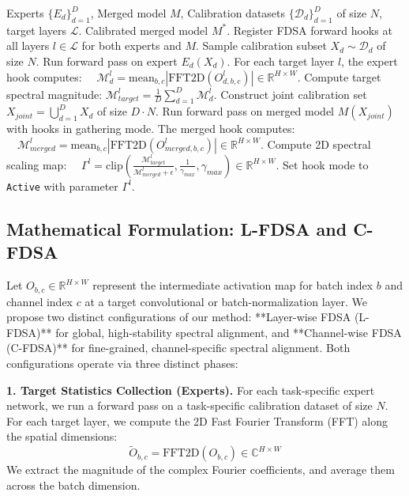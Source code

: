 \documentclass{article}
\begin{document}
\begin{algorithm}[tb]
\caption{Frequency-Domain Spectral Alignment (FDSA)}
\label{alg:fdsa}
\begin{algorithmic}[1]
 Experts $\{E_d\}_{d=1}^D$, Merged model $M$, Calibration datasets $\{\mathcal{D}_d\}_{d=1}^D$ of size $N$, target layers $\mathcal{L}$.
 Calibrated merged model $M^*$.
\STATE Register FDSA forward hooks at all layers $l \in \mathcal{L}$ for both experts and $M$.
    \STATE Sample calibration subset $X_d \sim \mathcal{D}_d$ of size $N$.
    \STATE Run forward pass on expert $E_d(X_d)$.
    \STATE For each target layer $l$, the expert hook computes:
    \STATE $\quad \mathcal{M}_{d}^l = \text{mean}_{b,c} | \text{FFT2D}(O_{d,b,c}^l) | \in \mathbb{R}^{H \times W}$.
\ENDFOR
{}
    \STATE Compute target spectral magnitude: $\mathcal{M}_{target}^l = \frac{1}{D} \sum_{d=1}^D \mathcal{M}_{d}^l$.
\ENDFOR
\STATE Construct joint calibration set $X_{joint} = \bigcup_{d=1}^D X_d$ of size $D \cdot N$.
\STATE Run forward pass on merged model $M(X_{joint})$ with hooks in gathering mode.
    \STATE The merged hook computes:
    \STATE $\quad \mathcal{M}_{merged}^l = \text{mean}_{b,c} | \text{FFT2D}(O_{merged,b,c}^l) | \in \mathbb{R}^{H \times W}$.
    \STATE Compute 2D spectral scaling map:
    \STATE $\quad \Gamma^l = \text{clip}\left(\frac{\mathcal{M}_{target}^l}{\mathcal{M}_{merged}^l + \epsilon}, \frac{1}{\gamma_{max}}, \gamma_{max}\right) \in \mathbb{R}^{H \times W}$.
    \STATE Set hook mode to \texttt{Active} with parameter $\Gamma^l$.
\ENDFOR
\end{algorithmic}
\end{algorithm}

\subsection{Mathematical Formulation: L-FDSA and C-FDSA}
Let $O_{b,c} \in \mathbb{R}^{H \times W}$ represent the intermediate activation map for batch index $b$ and channel index $c$ at a target convolutional or batch-normalization layer. We propose two distinct configurations of our method: **Layer-wise FDSA (L-FDSA)** for global, high-stability spectral alignment, and **Channel-wise FDSA (C-FDSA)** for fine-grained, channel-specific spectral alignment. Both configurations operate via three distinct phases:

\textbf{1. Target Statistics Collection (Experts).}
For each task-specific expert network, we run a forward pass on a task-specific calibration dataset of size $N$. For each target layer, we compute the 2D Fast Fourier Transform (FFT) along the spatial dimensions:
\begin{equation}
    \tilde{O}_{b,c} = \text{FFT2D}(O_{b,c}) \in \mathbb{C}^{H \times W}
\end{equation}
We extract the magnitude of the complex Fourier coefficients, and average them across the batch dimension.
\end{document}

